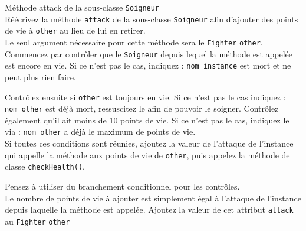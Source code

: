 \begin{Exercice}[10 minutes] Méthode attack de la sous-classe \lstinline{Soigneur} \\

Réécrivez la méthode \lstinline{attack} de la sous-classe \lstinline{Soigneur} afin d'ajouter des points de vie à \lstinline{other} au lieu de lui en retirer. \\

Le seul argument nécessaire pour cette méthode sera le \lstinline{Fighter} \lstinline{other}. \\

Commencez par contrôler que le \lstinline{Soigneur} depuis lequel la méthode est appelée est encore en vie. Si ce n'est pas le cas, indiquez : \lstinline{nom_instance} est mort et ne peut plus rien faire.

Contrôlez ensuite si \lstinline{other} est toujours en vie. Si ce n'est pas le cas indiquez : \lstinline{nom_other} est déjà mort, ressuscitez le afin de pouvoir le soigner. Contrôlez également qu'il ait moins de 10 points de vie. Si ce n'est pas le cas, indiquez le via : \lstinline{nom_other} a déjà le maximum de points de vie. \\

Si toutes ces conditions sont réunies, ajoutez la valeur de l'attaque de l'instance qui appelle la méthode aux points de vie de \lstinline{other}, puis appelez la méthode de classe \lstinline{checkHealth()}.

\begin{conseil}
Pensez à utiliser du branchement conditionnel pour les contrôles. \\

Le nombre de points de vie à ajouter est simplement égal à l'attaque de l'instance depuis laquelle la méthode est appelée. Ajoutez la valeur de cet attribut \lstinline{attack} au \lstinline{Fighter} \lstinline{other}

\end{conseil}

\begin{solution}
	
\end{solution}

\end{Exercice}


